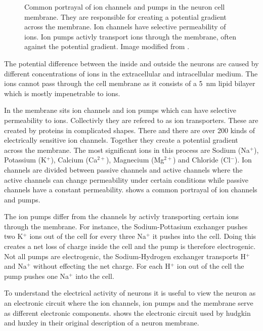 \documentclass[altfont, fleqn]{uiophd}
\renewcommand{\Cref}[1]{{\color{viridis_03}\myCref{#1}}}
\begin{document}
\begin{figure}[h]
    \caption{
        Common portrayal of ion channels and pumps in the neuron cell membrane. They are responsible for
        creating a potential gradient across the membrane. 
        Ion channels have
        selective permeability of ions. Ion pumps activly transport ions
        through the membrane, often against the potential gradient. 
        Image modified from 
        \textcites{sterratt_principles_2011}.
    }
    \label{fig:2_ion_channels}
\end{figure}
The potential difference between the inside and outside the neurons 
are caused by different concentrations of 
ions
in the extracellular and intracellular medium. 
The ions cannot pass through 
the cell membrane as it
consists of a \SI{5}{\nano\metre} lipid bilayer which is mostly impenetrable 
to ions. 

In the membrane sits ion channels and 
ion pumps which can have selective permeability to ions. 
Collectivly they are refered to as ion transporters. 
These are created by proteins in complicated shapes. 
There and there are over 200 
kinds of electrically sensitive ion channels.
Together they create a 
potential gradient across the membrane. 
The most significant ions in this process are Sodium (Na$^+$), Potassium (K$^+$), 
Calcium (Ca$^{2+}$), Magnecium (Mg$^{2+}$) and Chloride (Cl$^{-}$). 
Ion channels are divided between passive channels and 
active channels where the active channels can change 
permeability under certain conditions while passive channels have a constant
permeability. 
\Cref{fig:2_ion_channels} shows a common portrayal of ion channels and pumps. 

The ion pumps differ from the channels by activly transporting certain
ions through the membrane. 
For instance, the Sodium-Pottasium exchanger pushes two K$^+$ ions out of the cell
for every three Na$^+$ it pushes into the cell. Doing this creates a net 
loss of charge inside the cell and the pump is therefore electrogenic. 
Not all pumps are electrogenic, the Sodium-Hydrogen exchanger transports
H$^+$ and Na$^+$ without effecting the net charge.
For each H$^+$ ion out of the cell the pump pushes one Na$^+$
into the cell. 

To understand the electrical activity of neurons it is useful
to view the neuron as an electronic circuit where the ion channels, ion pumps
and the membrane serve as different electronic components.
\Cref{fig:2_hud_hux} shows the electronic circuit used by hudgkin
and huxley in their original description of a neuron membrane. 
\end{document}
